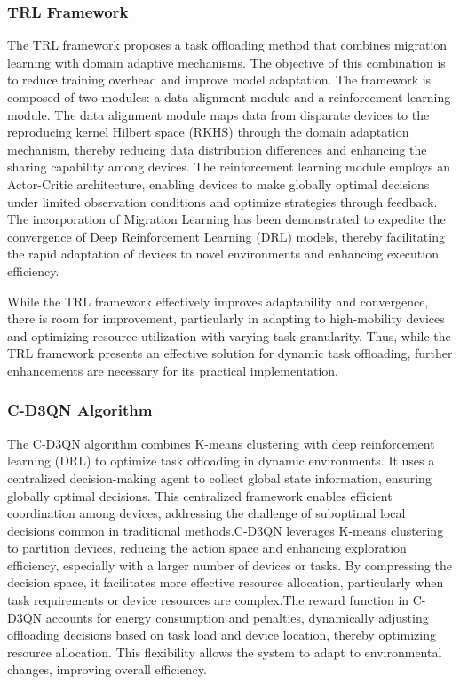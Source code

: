 \documentclass[journal]{IEEEtran}
\begin{document}
\subsubsection{TRL Framework}

The TRL framework proposes a task offloading method that combines migration learning with domain adaptive mechanisms. The objective of this combination is to reduce training overhead and improve model adaptation. The framework is composed of two modules: a data alignment module and a reinforcement learning module. The data alignment module maps data from disparate devices to the reproducing kernel Hilbert space (RKHS) through the domain adaptation mechanism, thereby reducing data distribution differences and enhancing the sharing capability among devices. The reinforcement learning module employs an Actor-Critic architecture, enabling devices to make globally optimal decisions under limited observation conditions and optimize strategies through feedback. The incorporation of Migration Learning has been demonstrated to expedite the convergence of Deep Reinforcement Learning (DRL) models, thereby facilitating the rapid adaptation of devices to novel environments and enhancing execution efficiency. 

While the TRL framework effectively improves adaptability and convergence, there is room for improvement, particularly in adapting to high-mobility devices and optimizing resource utilization with varying task granularity. Thus, while the TRL framework presents an effective solution for dynamic task offloading, further enhancements are necessary for its practical implementation.~\cite{zhou02}

\subsubsection{C-D3QN Algorithm}

The C-D3QN algorithm combines K-means clustering with deep reinforcement learning (DRL) to optimize task offloading in dynamic environments. It uses a centralized decision-making agent to collect global state information, ensuring globally optimal decisions. This centralized framework enables efficient coordination among devices, addressing the challenge of suboptimal local decisions common in traditional methods.C-D3QN leverages K-means clustering to partition devices, reducing the action space and enhancing exploration efficiency, especially with a larger number of devices or tasks. By compressing the decision space, it facilitates more effective resource allocation, particularly when task requirements or device resources are complex.The reward function in C-D3QN accounts for energy consumption and penalties, dynamically adjusting offloading decisions based on task load and device location, thereby optimizing resource allocation. This flexibility allows the system to adapt to environmental changes, improving overall efficiency.
\end{document}
